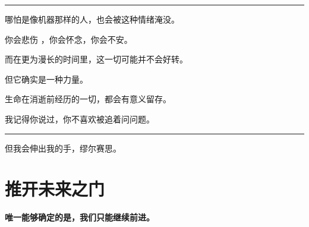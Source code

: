 \documentclass[openany]{book}
\begin{document}
\par\noindent\rule{\textwidth}{0.4pt}
哪怕是像机器那样的人，也会被这种情绪淹没。\par
你会悲伤 ，你会怀念，你会不安。\par
而在更为漫长的时间里，这一切可能并不会好转。\par
但它确实是一种力量。\par
生命在消逝前经历的一切，都会有意义留存。\par
我记得你说过，你不喜欢被追着问问题。
\par\noindent\rule{\textwidth}{0.4pt}

\begin{dialogue}
     但我会伸出我的手，缪尔赛思。
\end{dialogue}

\chapter{推开未来之门}
\begin{center} \textbf{唯一能够确定的是，我们只能继续前进。}\end{center} \par
\clearpage
\end{document}
